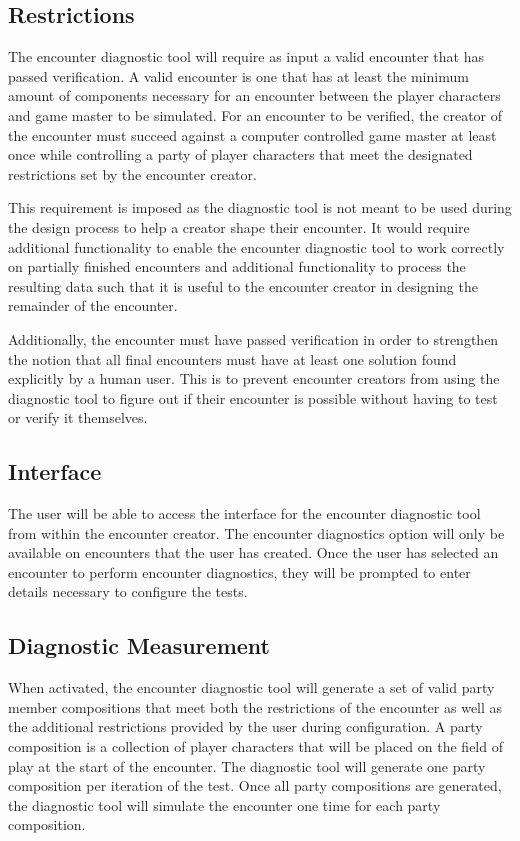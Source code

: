 \documentclass[12pt,a4paper]{report}
\begin{document}
		\subsection{Restrictions}
		The encounter diagnostic tool will require as input a valid encounter that has passed verification. A valid encounter is one that has at least the minimum amount of components necessary for an encounter between the player characters and game master to be simulated. For an encounter to be verified, the creator of the encounter must succeed against a computer controlled game master at least once while controlling a party of player characters that meet the designated restrictions set by the encounter creator.  
		
		This requirement is imposed as the diagnostic tool is not meant to be used during the design process to help a creator shape their encounter. It would require additional functionality to enable the encounter diagnostic tool to work correctly on partially finished encounters and additional functionality to process the resulting data such that it is useful to the encounter creator in designing the remainder of the encounter. 
		
		Additionally, the encounter must have passed verification in order to strengthen the notion that all final encounters must have at least one solution found explicitly by a human user. This is to prevent encounter creators from using the diagnostic tool to figure out if their encounter is possible without having to test or verify it themselves. 
		\subsection{Interface}
		The user will be able to access the interface for the encounter diagnostic tool from within the encounter creator. The encounter diagnostics option will only be available on encounters that the user has created. Once the user has selected an encounter to perform encounter diagnostics, they will be prompted to enter details necessary to configure the tests. 
		
		
		\subsection{Diagnostic Measurement}
		When activated, the encounter diagnostic tool will generate a set of valid party member compositions that meet both the restrictions of the encounter as well as the additional restrictions provided by the user during configuration. A party composition is a collection of player characters that will be placed on the field of play at the start of the encounter. The diagnostic tool will generate one party composition per iteration of the test. Once all party compositions are generated, the diagnostic tool will simulate the encounter one time for each party composition. 
		
\end{document}
